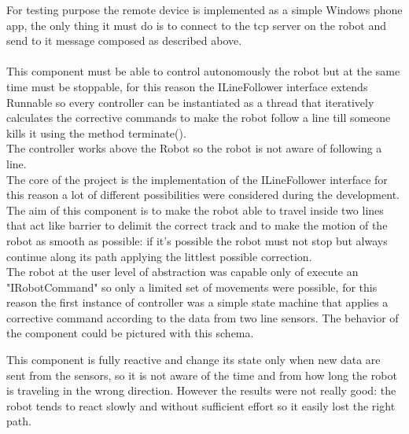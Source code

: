 \documentclass{llncs}
\begin{document}
For testing purpose the remote device is implemented as a simple Windows phone app, the only thing it must do is to connect to the tcp server on the robot and send to it message composed as described above.\\

\newpage
{}\\
This component must be able to control autonomously the robot but at the same time must be stoppable, for this reason the ILineFollower interface extends Runnable so every controller can be instantiated as a thread that iteratively calculates the corrective commands to make the robot follow a line till someone kills it using the method terminate().\\ 
The controller works above the Robot so the robot is not aware of following a line.\\
The core of the project is the implementation of the ILineFollower interface for this reason a lot of different possibilities were considered during the development. The aim of this component is to make the robot able to travel inside two lines that act like barrier to delimit the correct track and to make the motion of the robot as smooth as possible: if it's possible the robot must not stop but always continue along its path applying the littlest possible correction.\\
The robot at the user level of abstraction was capable only of execute an "IRobotCommand" so only a limited set of movements were possible, for this reason the first instance of controller was a simple state machine that applies a corrective command according to the data from two line sensors. The behavior of the component could be pictured with this schema.
\begin{center}
\end{center}
\noindent This component is fully reactive and change its state only when new data are sent from the sensors, so it is not aware of the time and from how long the robot is traveling in the wrong direction. However the results were not really good: the robot tends to react slowly and without sufficient effort so it easily lost the right path.
\end{document}

